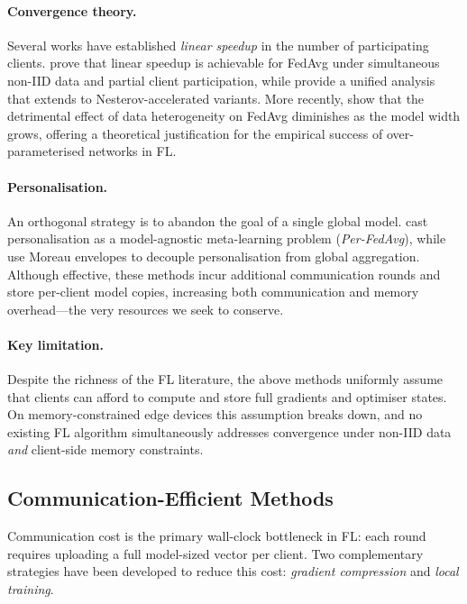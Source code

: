\paragraph{Convergence theory.}
Several works have established \emph{linear speedup} in the number of
participating clients.  \citet{yang2021achieving} prove that linear
speedup is achievable for FedAvg under simultaneous non-IID data and
partial client participation, while \citet{qu2020unified} provide a
unified analysis that extends to Nesterov-accelerated variants.
More recently, \citet{jian2025widening} show that the detrimental
effect of data heterogeneity on FedAvg diminishes as the model width
grows, offering a theoretical justification for the empirical success
of over-parameterised networks in FL.

\paragraph{Personalisation.}
An orthogonal strategy is to abandon the goal of a single global
model.  \citet{fallah2020personalized} cast personalisation as a
model-agnostic meta-learning problem (\emph{Per-FedAvg}), while
\citet{dinh2020personalized} use Moreau envelopes to decouple
personalisation from global aggregation.  Although effective, these
methods incur additional communication rounds and store per-client
model copies, increasing both communication and memory overhead—the
very resources we seek to conserve.

\paragraph{Key limitation.}
Despite the richness of the FL literature, the above methods
uniformly assume that clients can afford to compute and store full
gradients and optimiser states.  On memory-constrained edge devices
this assumption breaks down, and no existing FL algorithm
simultaneously addresses convergence under non-IID data
\emph{and} client-side memory constraints.

\subsection{Communication-Efficient Methods}

Communication cost is the primary wall-clock bottleneck in FL: each
round requires uploading a full model-sized vector per client.
Two complementary strategies have been developed to reduce this cost:
\emph{gradient compression} and \emph{local training}.

